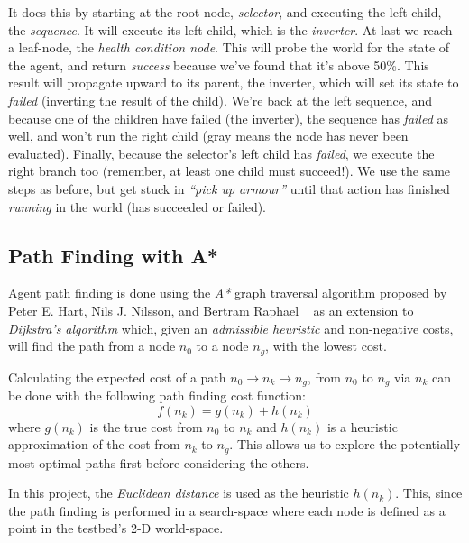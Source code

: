 \documentclass[a4paper, twocolumn]{article}
\begin{document}
        It does this by starting at the root node, \emph{selector}, and executing the left child, the \emph{sequence}. It will execute its left child, which is the \emph{inverter}. At last we reach a leaf-node, the \emph{health condition node}. This will probe the world for the state of the agent, and return \emph{success} because we've found that it's above 50\%. This result will propagate upward to its parent, the inverter, which will set its state to \emph{failed} (inverting the result of the child). We're back at the left sequence, and because one of the children have failed (the inverter), the sequence has \emph{failed} as well, and won't run the right child (gray means the node has never been evaluated). Finally, because the selector's left child has \emph{failed}, we execute the right branch too (remember, at least one child must succeed!). We use the same steps as before, but get stuck in \emph{``pick up armour''} until that action has finished \emph{running} in the world (has succeeded or failed).

        \subsection{Path Finding with A*} \label{sec:path_finding}

	Agent path finding is done using the \emph{A*} graph traversal algorithm proposed by Peter E. Hart, Nils J. Nilsson, and Bertram Raphael ~\cite{hart1968formal} as an extension to \emph{Dijkstra's algorithm} which, given an \emph{admissible heuristic} and non-negative costs, will find the path from a node \(n_0\) to a node \(n_g\), with the lowest cost.
	
    Calculating the expected cost of a path \(n_0 \rightarrow n_k \rightarrow n_g\), from \(n_0\) to \(n_g\) via \(n_k\) can be done with the following path finding cost function:
	\begin{equation*}
		f(n_k) = g(n_k) + h(n_k)
	\end{equation*}	
	where \(g(n_k)\) is the true cost from \(n_0\) to \(n_k\) and \(h(n_k)\) is a heuristic approximation of the cost from \(n_k\) to \(n_g\). This allows us to explore the potentially most optimal paths first before considering the others.

        In this project, the \emph{Euclidean distance} is used as the heuristic \(h(n_k)\). This, since the path finding is performed in a search-space where each node is defined as a point in the testbed's 2-D world-space.
\end{document}
